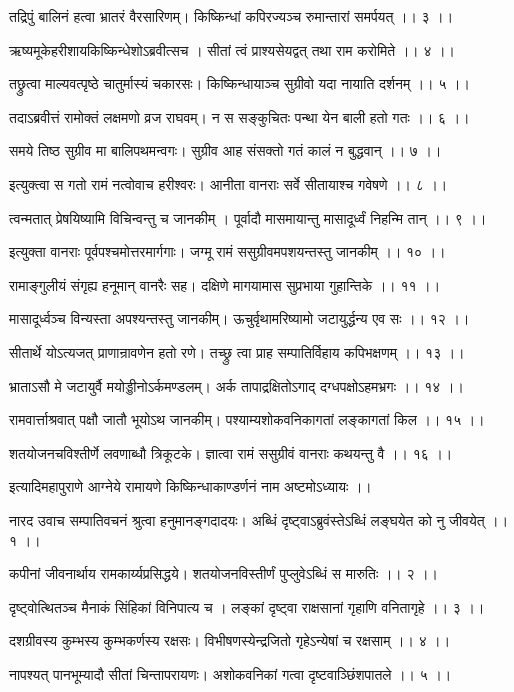 तद्रिपुं बालिनं हत्वा भ्रातरं वैरसारिणम्।
किष्किन्धां कपिरज्यञ्च रुमान्तारां समर्पयत् ।। ३ ।।

ऋष्यमूकेहरीशायकिष्किन्धेशोऽब्रवीत्सच ।
सीतां त्वं प्राश्यसेयद्वत् तथा राम करोमिते ।। ४ ।।

तछ्रुत्वा माल्यवत्पृष्ठे चातुर्मास्यं चकारसः।
किष्किन्धायाञ्च सुग्रीवो यदा नायाति दर्शनम् ।। ५ ।।

तदाऽब्रवीत्तं रामोक्तं लक्षमणो व्रज राघवम्।
न स सङ्कुचितः पन्था येन बाली हतो गतः ।। ६ ।।

समये तिष्ठ सुग्रीव मा बालिपथमन्वगः।
सुग्रीव आह संसक्तो गतं कालं न बुद्धवान् ।। ७ ।।

इत्युक्त्वा स गतो रामं नत्वोवाच हरीश्वरः।
आनीता वानराः सर्वे सीतायाश्च गवेषणे ।। ८ ।।

त्वन्मतात् प्रेषयिष्यामि विचिन्वन्तु च जानकीम् ।
पूर्वादौ मासमायान्तु मासादूर्ध्वं निहन्मि तान् ।। ९ ।।

इत्युक्ता वानराः पूर्वपश्चमोत्तरमार्गगाः।
जग्मू रामं ससुग्रीवमपशयन्तस्तु जानकीम् ।। १० ।।

रामाङ्गुलीयं संगृह्य हनूमान् वानरैः सह।
दक्षिणे मागयामास सुप्रभाया गुहान्तिके ।। ११ ।।

मासादूर्ध्वञ्च विन्यस्ता अपश्यन्तस्तु जानकीम्।
ऊचुर्वृथामरिष्यामो जटायुर्द्धन्य एव सः ।। १२ ।।

सीतार्थे योऽत्यजत् प्राणान्रावणेन हतो रणे।
तच्छ्रु त्वा प्राह सम्पातिर्विहाय कपिभक्षणम् ।। १३ ।।

भ्राताऽसौ मे जटायुर्वै मयोड्डीनोऽर्कमण्डलम्।
अर्क तापाद्रक्षितोऽगाद् दग्धपक्षोऽहमभ्रगः ।। १४ ।।

रामवार्त्ताश्रवात् पक्षौ जातौ भूयोऽथ जानकीम्।
पश्याम्यशोकवनिकागतां लङ्कागतां किल ।। १५ ।।

शतयोजनचविश्तीर्णे लवणाब्धौ त्रिकूटके।
ज्ञात्वा रामं ससुग्रीवं वानराः कथयन्तु वै ।। १६ ।।

इत्यादिमहापुराणे आग्नेये रामायणे किष्किन्धाकाण्डर्णनं नाम अष्टमोऽध्यायः ।।

नारद उवाच
सम्पातिवचनं श्रुत्वा हनुमानङ्गदादयः।
अब्धिं दृष्ट्वाऽब्रुवंस्तेऽब्धिं लङ्घयेत को नु जीवयेत् ।। १ ।।

कपीनां जीवनार्थाय रामकार्य्यप्रसिद्धये।
शतयोजनविस्तीर्णं पुप्लुवेऽब्धिं स मारुतिः ।। २ ।।

दृष्ट्वोत्थितञ्च मैनाकं सिंहिकां विनिपात्य च ।
लङ्कां दृष्ट्वा राक्षसानां गृहाणि वनितागृहे ।। ३ ।।

दशग्रीवस्य कुम्भस्य कुम्भकर्णस्य रक्षसः।
विभीषणस्येन्द्रजितो गृहेऽन्येषां च रक्षसाम् ।। ४ ।।

नापश्यत् पानभूम्यादौ सीतां चिन्तापरायणः।
अशोकवनिकां गत्वा दृष्टवाञ्छिंशपातले ।। ५ ।।

